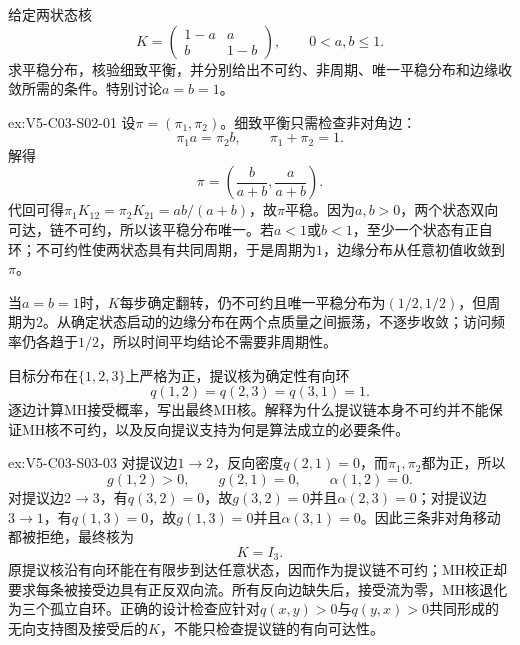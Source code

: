 \begin{SLChapterExercisePairSection}
\begin{exercise}\label{ex:V5-C03-S02-01}
给定两状态核
\[
K=\begin{pmatrix}1-a&a\\ b&1-b\end{pmatrix},
\qquad 0<a,b\le1.
\]
求平稳分布，核验细致平衡，并分别给出不可约、非周期、唯一平稳分布和边缘收敛所需的条件。特别讨论$a=b=1$。
\end{exercise}
\ifSLFullEdition
{}\label{sol:V5-C03-S02-01}
\begin{chapterexercisesolution}{ex:V5-C03-S02-01}
设$\pi=(\pi_1,\pi_2)$。细致平衡只需检查非对角边：
\[
\pi_1a=\pi_2b,\qquad \pi_1+\pi_2=1.
\]
解得
\[
\pi=\left(\frac{b}{a+b},\frac{a}{a+b}\right).
\]
代回可得$\pi_1K_{12}=\pi_2K_{21}=ab/(a+b)$，故$\pi$平稳。因为$a,b>0$，两个状态双向可达，链不可约，所以该平稳分布唯一。若$a<1$或$b<1$，至少一个状态有正自环；不可约性使两状态具有共同周期，于是周期为$1$，边缘分布从任意初值收敛到$\pi$。

当$a=b=1$时，$K$每步确定翻转，仍不可约且唯一平稳分布为$(1/2,1/2)$，但周期为$2$。从确定状态启动的边缘分布在两个点质量之间振荡，不逐步收敛；访问频率仍各趋于$1/2$，所以时间平均结论不需要非周期性。
\end{chapterexercisesolution}
\fi

\begin{exercise}\label{ex:V5-C03-S03-03}
目标分布在$\{1,2,3\}$上严格为正，提议核为确定性有向环
\[
q(1,2)=q(2,3)=q(3,1)=1.
\]
逐边计算MH接受概率，写出最终MH核。解释为什么提议链本身不可约并不能保证MH核不可约，以及反向提议支持为何是算法成立的必要条件。
\end{exercise}
\ifSLFullEdition
{}\label{sol:V5-C03-S03-03}
\begin{chapterexercisesolution}{ex:V5-C03-S03-03}
对提议边$1\to2$，反向密度$q(2,1)=0$，而$\pi_1,\pi_2$都为正，所以
\[
g(1,2)>0,\qquad g(2,1)=0,\qquad \alpha(1,2)=0.
\]
对提议边$2\to3$，有$q(3,2)=0$，故$g(3,2)=0$并且$\alpha(2,3)=0$；对提议边$3\to1$，有$q(1,3)=0$，故$g(1,3)=0$并且$\alpha(3,1)=0$。因此三条非对角移动都被拒绝，最终核为
\[
K=I_3.
\]
原提议核沿有向环能在有限步到达任意状态，因而作为提议链不可约；MH校正却要求每条被接受边具有正反双向流。所有反向边缺失后，接受流为零，MH核退化为三个孤立自环。正确的设计检查应针对$q(x,y)>0$与$q(y,x)>0$共同形成的无向支持图及接受后的$K$，不能只检查提议链的有向可达性。
\end{chapterexercisesolution}
\fi


\end{SLChapterExercisePairSection}
